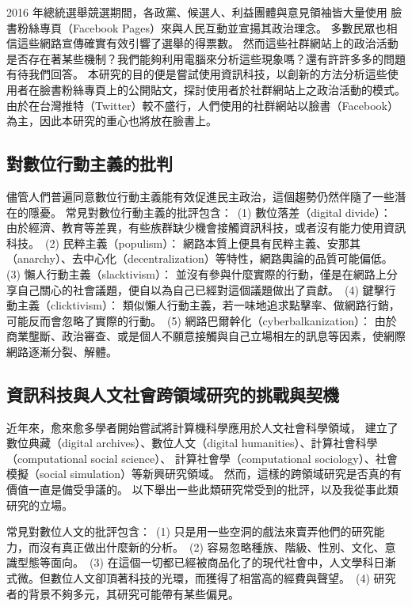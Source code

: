 \documentclass[letterpaper, 10pt, conference]{ieeeconf}   %
\begin{document}
\begin{CJK}{UTF8}{bsmi}
2016 年總統選舉競選期間，各政黨、候選人、利益團體與意見領袖皆大量使用%
臉書粉絲專頁（Facebook Pages）來與人民互動並宣揚其政治理念。%
多數民眾也相信這些網路宣傳確實有效引響了選舉的得票數。%
然而這些社群網站上的政治活動是否存在著某些機制？我們能夠利用電腦來分析這些現象嗎？還有許許多多的問題有待我們回答。%
本研究的目的便是嘗試使用資訊科技，以創新的方法分析這些使用者在臉書粉絲專頁上的公開貼文，探討使用者於社群網站上之政治活動的模式。%
由於在台灣推特（Twitter）較不盛行，人們使用的社群網站以臉書（Facebook）為主，因此本研究的重心也將放在臉書上。%

\subsection*{對數位行動主義的批判}

儘管人們普遍同意數位行動主義能有效促進民主政治，這個趨勢仍然伴隨了一些潛在的隱憂。%
常見對數位行動主義的批評包含：%
\,(1) 數位落差（digital divide）：%
由於經濟、教育等差異，有些族群缺少機會接觸資訊科技，或者沒有能力使用資訊科技。%
\,(2) 民粹主義（populism）：%
網路本質上便具有民粹主義、安那其（anarchy）、去中心化（decentralization）等特性，網路輿論的品質可能偏低。%
\,(3) 懶人行動主義（slacktivism）：%
並沒有參與什麼實際的行動，僅是在網路上分享自己關心的社會議題，便自以為自己已經對這個議題做出了貢獻。%
\,(4) 鍵擊行動主義（clicktivism）：%
類似懶人行動主義，若一味地追求點擊率、做網路行銷，可能反而會忽略了實際的行動。%
\,(5) 網路巴爾幹化（cyberbalkanization）：%
由於商業壟斷、政治審查、或是個人不願意接觸與自己立場相左的訊息等因素，使網際網路逐漸分裂、解體。%

\subsection*{資訊科技與人文社會跨領域研究的挑戰與契機}

近年來，愈來愈多學者開始嘗試將計算機科學應用於人文社會科學領域，%
建立了數位典藏（digital archives）、數位人文（digital humanities）、計算社會科學（computational social science）、%
計算社會學（computational sociology）、社會模擬（social simulation）等新興研究領域。%
然而，這樣的跨領域研究是否真的有價值一直是備受爭議的。%
以下舉出一些此類研究常受到的批評，以及我從事此類研究的立場。%

常見對數位人文的批評包含：%
\,(1) 只是用一些空洞的戲法來賣弄他們的研究能力，而沒有真正做出什麼新的分析。%
\,(2) 容易忽略種族、階級、性別、文化、意識型態等面向。%
\,(3) 在這個一切都已經被商品化了的現代社會中，人文學科日漸式微。但數位人文卻頂著科技的光環，而獲得了相當高的經費與聲望。%
\,(4) 研究者的背景不夠多元，其研究可能帶有某些偏見。%


\end{CJK}
\end{document}
